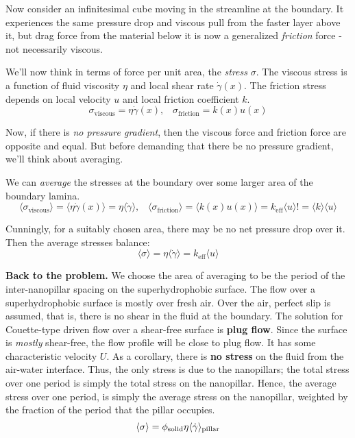 \documentclass{article}
\begin{document}
Now consider an infinitesimal cube moving in the streamline at the boundary.  It experiences the same pressure drop and viscous pull from the faster layer above it, but drag force from the material below it is now a generalized \emph{friction} force - not necessarily viscous.

We'll now think in terms of force per unit area, the \emph{stress} $\sigma$. The viscous stress is a function of fluid viscosity $\eta$ and local shear rate $\dot{\gamma}(x)$.  The friction stress depends on local velocity $u$ and local friction coefficient $k$.
\[ \sigma_{\mathrm{viscous}} = \eta \dot{\gamma}(x), \;\;\;
\sigma_{\mathrm{friction}} = k(x) u(x) \]

Now, if there is \emph{no pressure gradient}, then the viscous force and friction force are opposite and equal.  But before demanding that there be no pressure gradient, we'll think about averaging.

We can \emph{average} the stresses at the boundary over some larger area of the boundary lamina.
\[ \langle \sigma_{\mathrm{viscous}} \rangle = \langle \eta \dot{\gamma}(x) \rangle = \eta \langle \dot{\gamma} \rangle, \;\;\;
\langle \sigma_{\mathrm{friction}} \rangle = \langle k(x) u(x) \rangle
 = k_{\mathrm{eff}} \langle u \rangle != \langle k \rangle \langle u \rangle \]

Cunningly, for a suitably chosen area, there may be no net pressure drop over it. 
Then the average stresses balance:
\[ \langle \sigma \rangle = \eta \langle \dot{\gamma} \rangle = 
 k_{\mathrm{eff}} \langle u \rangle \]

\textbf{Back to the problem.}
We choose the area of averaging to be the period of the inter-nanopillar spacing on the superhydrophobic surface.
The flow over a superhydrophobic surface is mostly over fresh air.  Over the air, perfect slip is assumed, that is, there is no shear in the fluid at the boundary.  The solution for Couette-type driven flow over a shear-free surface is \textbf{plug flow}.  Since the surface is \emph{mostly} shear-free, the flow profile will be close to plug flow. It has some characteristic velocity $U$.
As a corollary, there is \textbf{no stress} on the fluid from the air-water interface. Thus, the only stress is due to the nanopillars; the total stress over one period is simply the total stress on the nanopillar. Hence, the average stress over one period, is simply the average stress on the nanopillar, weighted by the fraction of the period that the pillar occupies.
\[ \langle \sigma \rangle = \phi_{\mathrm{solid}} \eta \langle \dot{\gamma} \rangle_{\mathrm{pillar}} \]
\end{document}
